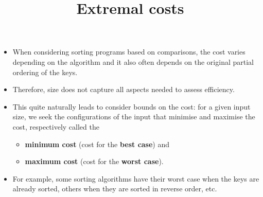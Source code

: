 \documentclass[wide]{slides}
\begin{document}
\begin{slide}
  \title{Extremal costs}

  \begin{itemize}

    \item When considering sorting programs based on comparisons, the
      cost varies depending on the algorithm and it also often depends
      on the original partial ordering of the keys.

    \item Therefore, size does not capture all aspects needed to
      assess efficiency.

    \item This quite naturally leads to consider bounds on the cost:
      for a given input size, we seek the configurations of the input
      that minimise and maximise the cost, respectively called the
      \begin{itemize}

        \item \textbf{minimum cost} (cost for the \textbf{best case})
          and

        \item \textbf{maximum cost} (cost for the \textbf{worst
          case}).

      \end{itemize}

    \item For example, some sorting algorithms have their worst case
      when the keys are already sorted, others when they are sorted in
      reverse order, etc.

  \end{itemize}

\end{slide}
\end{document}
